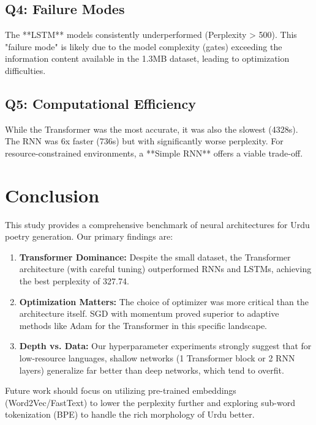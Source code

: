 \documentclass[12pt,a4paper]{article}
\begin{document}
\subsection{Q4: Failure Modes}
The **LSTM** models consistently underperformed (Perplexity > 500). This "failure mode" is likely due to the model complexity (gates) exceeding the information content available in the 1.3MB dataset, leading to optimization difficulties.

\subsection{Q5: Computational Efficiency}
While the Transformer was the most accurate, it was also the slowest (4328s). The RNN was 6x faster (736s) but with significantly worse perplexity. For resource-constrained environments, a **Simple RNN** offers a viable trade-off.

\section{Conclusion}

This study provides a comprehensive benchmark of neural architectures for Urdu poetry generation. Our primary findings are:
\begin{enumerate}
    \item \textbf{Transformer Dominance:} Despite the small dataset, the Transformer architecture (with careful tuning) outperformed RNNs and LSTMs, achieving the best perplexity of 327.74.
    \item \textbf{Optimization Matters:} The choice of optimizer was more critical than the architecture itself. SGD with momentum proved superior to adaptive methods like Adam for the Transformer in this specific landscape.
    \item \textbf{Depth vs. Data:} Our hyperparameter experiments strongly suggest that for low-resource languages, shallow networks (1 Transformer block or 2 RNN layers) generalize far better than deep networks, which tend to overfit.
\end{enumerate}

Future work should focus on utilizing pre-trained embeddings (Word2Vec/FastText) to lower the perplexity further and exploring sub-word tokenization (BPE) to handle the rich morphology of Urdu better.
\end{document}
